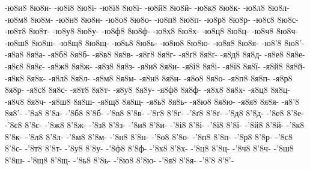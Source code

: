 {-ю8и8
8ю8и-
-ю8і8
8ю8і-
-ю8ї8
8ю8ї-
-ю8й8
8ю8й-
-ю8к8
8ю8к-
-ю8л8
8ю8л-
-ю8м8
8ю8м-
-ю8н8
8ю8н-
-ю8о8
8ю8о-
-ю8п8
8ю8п-
-ю8р8
8ю8р-
-ю8с8
8ю8с-
-ю8т8
8ю8т-
-ю8у8
8ю8у-
-ю8ф8
8ю8ф-
-ю8х8
8ю8х-
-ю8ц8
8ю8ц-
-ю8ч8
8ю8ч-
-ю8ш8
8ю8ш-
-ю8щ8
8ю8щ-
-ю8ь8
8ю8ь-
-ю8ю8
8ю8ю-
-ю8я8
8ю8я-
-ю8'8
8ю8'-
-я8а8
8я8а-
-я8б8
8я8б-
-я8в8
8я8в-
-я8г8
8я8г-
-я8ґ8
8я8ґ-
-я8д8
8я8д-
-я8е8
8я8е-
-я8є8
8я8є-
-я8ж8
8я8ж-
-я8з8
8я8з-
-я8и8
8я8и-
-я8і8
8я8і-
-я8ї8
8я8ї-
-я8й8
8я8й-
-я8к8
8я8к-
-я8л8
8я8л-
-я8м8
8я8м-
-я8н8
8я8н-
-я8о8
8я8о-
-я8п8
8я8п-
-я8р8
8я8р-
-я8с8
8я8с-
-я8т8
8я8т-
-я8у8
8я8у-
-я8ф8
8я8ф-
-я8х8
8я8х-
-я8ц8
8я8ц-
-я8ч8
8я8ч-
-я8ш8
8я8ш-
-я8щ8
8я8щ-
-я8ь8
8я8ь-
-я8ю8
8я8ю-
-я8я8
8я8я-
-я8'8
8я8'-
-'8а8
8'8а-
-'8б8
8'8б-
-'8в8
8'8в-
-'8г8
8'8г-
-'8ґ8
8'8ґ-
-'8д8
8'8д-
-'8е8
8'8е-
-'8є8
8'8є-
-'8ж8
8'8ж-
-'8з8
8'8з-
-'8и8
8'8и-
-'8і8
8'8і-
-'8ї8
8'8ї-
-'8й8
8'8й-
-'8к8
8'8к-
-'8л8
8'8л-
-'8м8
8'8м-
-'8н8
8'8н-
-'8о8
8'8о-
-'8п8
8'8п-
-'8р8
8'8р-
-'8с8
8'8с-
-'8т8
8'8т-
-'8у8
8'8у-
-'8ф8
8'8ф-
-'8х8
8'8х-
-'8ц8
8'8ц-
-'8ч8
8'8ч-
-'8ш8
8'8ш-
-'8щ8
8'8щ-
-'8ь8
8'8ь-
-'8ю8
8'8ю-
-'8я8
8'8я-
-'8'8
8'8'-
}
\endgroup
